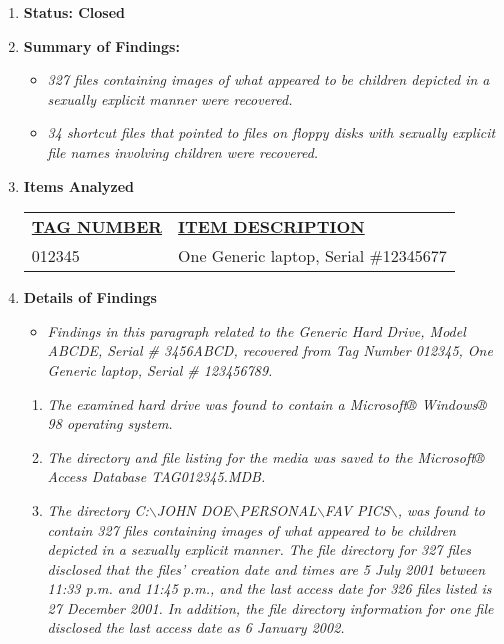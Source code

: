 \begin{enumerate}
\item \textbf{Status: Closed}\\
\item \textbf{Summary of Findings:}

\begin{itemize}
\item \textit{327 files containing images of what appeared to be children depicted in a sexually explicit manner were recovered.}
\item \textit{34 shortcut files that pointed to files on floppy disks with sexually explicit file names involving children were recovered.}
\end{itemize}

\item \textbf{Items Analyzed}

\begin{longtable}{p{}p{}}
\textbf{\underline{TAG NUMBER}} & \textbf{\underline{ITEM DESCRIPTION}} \\
012345 & One Generic laptop, Serial \#12345677
\end{longtable}

\item \textbf{Details of Findings}

\begin{itemize}

\item \textit{Findings in this paragraph related to the Generic Hard Drive, Model ABCDE, Serial \# 3456ABCD, recovered from Tag Number 012345, One Generic laptop, Serial \# 123456789.}
\end{itemize}

\begin{enumerate}
\item \textit{The examined hard drive was found to contain a Microsoft® Windows® 98 operating system.} 

\item \textit{The directory and file listing for the media was saved to the Microsoft® Access Database TAG012345.MDB.}

\item \textit{The directory C:$\backslash$JOHN DOE$\backslash$PERSONAL$\backslash$FAV PICS$\backslash$, was found to contain 327 files containing images of what appeared to be children depicted in a sexually explicit manner. The file directory for 327 files disclosed that the files’ creation date and times are 5 July 2001 between 11:33 p.m. and 11:45 p.m., and the last access date for 326 files listed is 27 December 2001. In addition, the file directory information for one file disclosed the last access date as 6 January 2002.}


\end{enumerate}
\end{enumerate}
